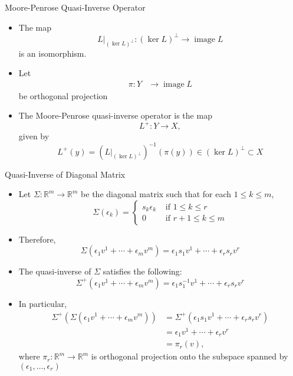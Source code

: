 \documentclass[usenames,dvipsnames,10pt]{beamer}
\newcommand{\R}{\mathbb{R}}
\newcommand\image{\operatorname{image}}
\begin{document}
\begin{frame}
  {Moore-Penrose Quasi-Inverse Operator}

  \begin{itemize}
  \item The map
    \[
      \left.L\right|_{(\ker L)^\perp}: (\ker L)^\perp \rightarrow \image L
    \]
    is an isomorphism.
  \item Let
    \begin{align*}
      \pi: Y &\rightarrow \image L
    \end{align*}
    be orthogonal projection
  \item The Moore-Penrose quasi-inverse operator is the map
    \[
      L^+: Y \rightarrow X,
    \]
    given by
    \[
      L^+(y) = \left(\left.L\right|_{(\ker L)^\perp}\right)^{-1}(\pi(y)) \in (\ker L)^\perp \subset X
    \]
  \end{itemize}
\end{frame}

\begin{frame}
  {Quasi-Inverse of Diagonal Matrix}

  \begin{itemize}
  \item Let $\Sigma: \R^m \rightarrow \R^m$ be the diagonal matrix such that for each $1 \le k \le m$,
    \[ \Sigma(\epsilon_k) = \begin{cases} s_k\epsilon_k &\text{ if }1 \le k \le r\\ 0 &\text{ if }r+1 \le k \le m \end{cases} \]
  \item Therefore,
    \[ \Sigma(\epsilon_1v^1+\cdots+\epsilon_mv^m) = \epsilon_1s_1v^1+\cdots+\epsilon_rs_rv^r \]
  \item The quasi-inverse of $\Sigma$ satisfies the following:
    \[ \Sigma^+(\epsilon_1v^1+\cdots+\epsilon_mv^m) = \epsilon_1s_1^{-1}v^1+\cdots+ \epsilon_rs_rv^r \]
  \item In particular,
    \begin{align*}
      \Sigma^+(\Sigma(\epsilon_1v^1+\cdots+\epsilon_mv^m))
      &= \Sigma^+(\epsilon_1s_1v^1+\cdots+\epsilon_rs_rv^r)\\
      &= \epsilon_1v^1+\cdots+\epsilon_rv^r\\
      &= \pi_r(v),
    \end{align*}
    where $\pi_r: \R^m \rightarrow \R^m$ is orthogonal projection onto the subspace spanned by $(\epsilon_1, \dots, \epsilon_r)$
  \end{itemize}
\end{frame}
\end{document}
